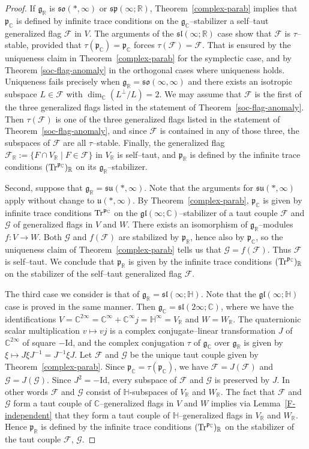 \documentclass[oneside,leqno,11pt]{article}
\def\gg{\mathfrak{g}}
\def\ggl{\mathfrak{gl}}
\def\gp{\mathfrak{p}}
\def\gsl{\mathfrak{sl}}
\def\gso{\mathfrak{so}}
\def\gsu{\mathfrak{su}}
\def\gsp{\mathfrak{sp}}
\def\gu{\mathfrak{u}}
\def\Tr{{\rm Tr}}
\def\C{\mathbb{C}}
\def\H{\mathbb{H}}
\def\R{\mathbb{R}}
\def\cF{\mathcal{F}}
\def\cG{\mathcal{G}}
\begin{document}
\begin{proof}
If $\gg_\R$ is $\gso(*,\infty)$ or $\gsp(\infty;\R)$, Theorem~\ref{complex-parab} implies that $\gp_\C$ is defined by infinite trace conditions on the $\gg_\C$--stabilizer a self--taut generalized flag $\cF$ in $V$.
The arguments of the $\gsl(\infty;\R)$ case show that $\cF$ is $\tau$--stable, 
provided that $\tau (\gp_\C) = \gp_\C$ forces 
$\tau(\cF) = \cF$.  That is ensured by the uniqueness claim in Theorem~\ref{complex-parab} for the
symplectic case, and by Theorem \ref{soc-flag-anomaly} in the orthogonal cases where uniqueness holds.  Uniqueness fails precisely when $\gg_\R =
\gso(\infty,\infty)$ and there exists an isotropic subspace $L \in \cF$ with  $\dim_\C (L^\perp / L) = 2$.
We may assume that $\cF$ is the first of the three generalized flags listed in the statement of Theorem~\ref{soc-flag-anomaly}.  Then $\tau (\cF)$ is one of the three generalized flags listed in the statement of Theorem~\ref{soc-flag-anomaly}, and since $\cF$ is contained in any of those three, the subspaces of $\cF$ are all $\tau$--stable.  Finally, the generalized flag $\cF_\R := \{ F \cap V_\R \mid F \in \cF \}$ in $V_\R$ is self--taut, and $\gp_\R$ is defined by the infinite trace conditions $(\Tr^{\gp_\C})_\R$ on its $\gg_\R$--stabilizer.

Second, suppose that $\gg_\R = \gsu(*,\infty)$.  Note that the arguments for $\gsu(*,\infty)$ apply without change to $\gu(*,\infty)$.  
By Theorem~\ref{complex-parab}, $\gp_\C$ is
given by infinite trace conditions $\Tr^{\gp_\C}$ on the 
$\ggl(\infty;\C)$--stabilizer of a taut couple $\cF$ and $\cG$ of generalized flags in $V$ and $W$.  
There exists an isomorphism of $\gg_\R$--modules $f: V \to W$. 
Both $\cG$ and $f(\cF)$ are stabilized by $\gp_\R$, hence also by $\gp_\C$, so the uniqueness claim of Theorem~\ref{complex-parab} tells us that $\cG = f(\cF)$.
Thus $\cF$ is self--taut.
We conclude that $\gp_\R$ is given by the infinite trace conditions $(\Tr^{\gp_\C})_\R$ on the stabilizer of the self--taut generalized flag $\cF$.

The third case we consider is that of $\gg_\R = \gsl(\infty;\H)$. Note that the $\ggl(\infty;\H)$ case is proved in the same manner.
Then $\gg_\C = \gsl(2\infty;\C)$, where we have the identifications $V = \C^{2\infty} = \C^\infty + \C^\infty j = \H^\infty = V_\R$ and $W = W_\R$.
The quaternionic scalar multiplication $v \mapsto vj$ is a complex
conjugate--linear transformation $J$ of $\C^{2\infty}$ of square $-\mathrm{Id}$,
and the complex conjugation $\tau$ of $\gg_\C$ over $\gg_\R$ is given
by $\xi \mapsto J \xi J^{-1} = J^{-1} \xi J$.
Let $\cF$ and $\cG$ be the unique taut couple given by Theorem~\ref{complex-parab}.  
Since $\gp_\C = \tau(\gp_\C)$, we have $\cF = J(\cF)$ and $\cG = J(\cG)$.  Since $J^2 = -\mathrm{Id}$, every subspace of $\cF$ and $\cG$ is preserved by $J$.  In other words $\cF$ and $\cG$
consist of $\H$-subspaces of $V_\R$ and $W_\R$.  The fact that 
$\cF$ and $\cG$ form a taut couple of $\C$--generalized flags in 
$V$ and $W$ implies via Lemma~\ref{F-independent} that they form a 
taut couple  of $\H$--generalized flags in $V_\R$ and $W_\R$.
Hence $\gp_\R$ is defined by the infinite trace conditions $(\Tr^{\gp_\C})_\R$ on the stabilizer of the taut couple $\cF$, $\cG$. 


\end{proof}
\end{document}
